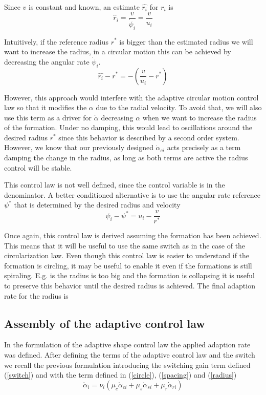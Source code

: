 Since $v$ is constant and known, an estimate $\hat{r_i}$ for $r_i$ is
\begin{equation}
\hat{r}_i = \frac{v}{\dot{\psi}_i}  = \frac{v}{u_i}
\end{equation}

Intuitively, if the reference radius $r^*$ is bigger than the estimated radius we will want to increase the radius, in a circular motion this can be achieved by decreasing the angular rate $\dot{\psi}_i$. 
\begin{equation}
\hat{r_i} - r^* = - \left( \frac{v}{u_i} - r^* \right)
\end{equation}

However, this approach would interfere with the adaptive circular motion control law so that it modifies the $\alpha$ due to the radial velocity. To avoid that, we will also use this term as a driver for $\dot{\alpha}$ decreasing $\alpha$ when we want to increase the radius of the formation. Under no damping, this would lead to oscillations around the desired radius $r^*$ since this behavior is described by a second order system. However, we know that our previously designed $\dot{\alpha}_{ci}$ acts precisely as a term damping the change in the radius, as long as both terms are active the radius control will be stable.

This control law is not well defined, since the control variable is in the denominator. A better conditioned alternative is to use the angular rate reference $\psi^*$ that is determined by the desired radius and velocity 
\begin{equation}
\psi_i - \psi^* = u_i - \frac{v}{r^*}
\end{equation}

Once again, this control law is derived assuming the formation has been achieved. This means that it will be useful to use the same switch as in the case of the circularization law. Even though this control law is easier to understand if the formation is circling, it may be useful to enable it even if the formations is still spiraling. E.g. is the radius is too big and the formation is collapsing it is useful to preserve this behavior until the desired radius is achieved. The final adaption rate for the radius is

\subsection{Assembly of the adaptive control law}
In the formulation of the adaptive shape control law the applied adaption rate was defined. After defining the terms of the adaptive control law and the switch we recall the previous formulation introducing the switching gain term defined (\ref{switch}) and with the term defined in (\ref{circle}), (\ref{spacing}) and (\ref{radius})
\begin{equation}
\label{shapeControlLaw}
\dot{\alpha}_i = \nu_i (\mu_c \dot{\alpha}_{ci} + \mu_s \dot{\alpha}_{si} + \mu_r \dot{\alpha}_{ri})
\end{equation}

